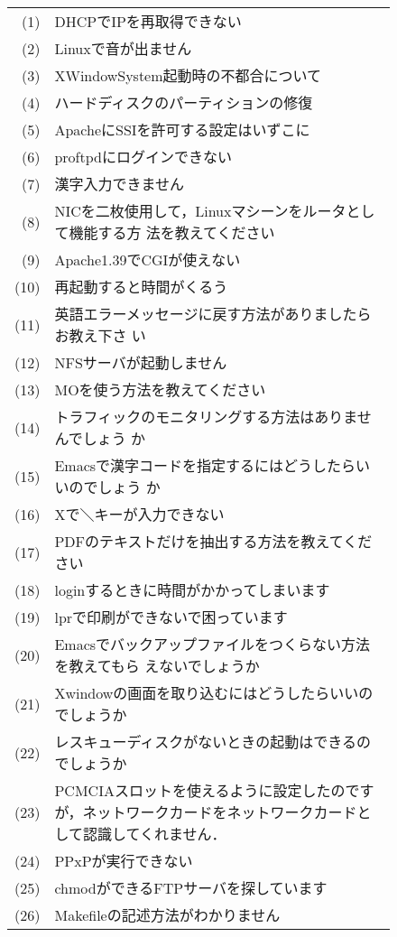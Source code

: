 	\begin{figure}[t]
	 \begin{center}
	  {\small
	  \begin{tabular}[t]{rp{120mm}}
	   (1) & DHCPでIPを再取得できない \\
	   (2) & Linuxで音が出ません \\
	   (3) & XWindowSystem起動時の不都合について \\
	   (4) & ハードディスクのパーティションの修復 \\
	   (5) & ApacheにSSIを許可する設定はいずこに \\
	   (6) & proftpdにログインできない \\
	   (7) & 漢字入力できません \\
	   (8) & NICを二枚使用して，Linuxマシーンをルータとして機能する方
	   法を教えてください \\
	  (9) & Apache1.39でCGIが使えない \\
	  (10) & 再起動すると時間がくるう \\
	  (11) & 英語エラーメッセージに戻す方法がありましたらお教え下さ
	  い \\
	  (12) & NFSサーバが起動しません \\
	  (13) & MOを使う方法を教えてください \\
	  (14) & トラフィックのモニタリングする方法はありませんでしょう
	  か \\
	  (15) & Emacsで漢字コードを指定するにはどうしたらいいのでしょう
	  か \\
	  (16) & Xで＼キーが入力できない \\
	  (17) & PDFのテキストだけを抽出する方法を教えてください \\
	  (18) & loginするときに時間がかかってしまいます \\
	  (19) & lprで印刷ができないで困っています \\
	  (20) & Emacsでバックアップファイルをつくらない方法を教えてもら
	  えないでしょうか \\
	  (21) & Xwindowの画面を取り込むにはどうしたらいいのでしょうか \\
	  (22) & レスキューディスクがないときの起動はできるのでしょうか \\
	  (23) & PCMCIAスロットを使えるように設定したのですが，ネットワークカードをネットワークカードとして認識してくれません．\\
	  (24) & PPxPが実行できない \\
	  (25) & chmodができるFTPサーバを探しています \\
	  (26) & Makefileの記述方法がわかりません \\

\end{tabular}}
\end{center}
\end{figure}

